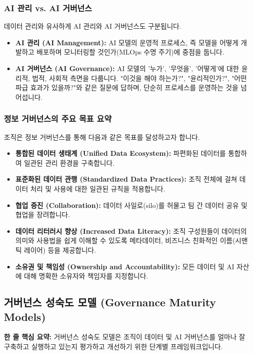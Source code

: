 \documentclass[11pt,a4paper]{article}
\begin{document}
\subsubsection*{AI 관리 vs. AI 거버넌스}
데이터 관리와 유사하게 AI 관리와 AI 거버넌스도 구분됩니다.
\begin{itemize}
    \item \textbf{AI 관리 (AI Management):} AI 모델의 운영적 프로세스, 즉 모델을 어떻게 개발하고 배포하며 모니터링할 것인가(MLOps 수명 주기)에 중점을 둡니다.
    \item \textbf{AI 거버넌스 (AI Governance):} AI 모델의 '누가', '무엇을', '어떻게'에 대한 윤리적, 법적, 사회적 측면을 다룹니다. "이것을 해야 하는가?", "윤리적인가?", "어떤 파급 효과가 있을까?"와 같은 질문에 답하며, 단순히 프로세스를 운영하는 것을 넘어섭니다.
\end{itemize}

\subsubsection*{정보 거버넌스의 주요 목표 요약}
조직은 정보 거버넌스를 통해 다음과 같은 목표를 달성하고자 합니다.
\begin{itemize}
    \item \textbf{통합된 데이터 생태계 (Unified Data Ecosystem):} 파편화된 데이터를 통합하여 일관된 관리 환경을 구축합니다.
    \item \textbf{표준화된 데이터 관행 (Standardized Data Practices):} 조직 전체에 걸쳐 데이터 처리 및 사용에 대한 일관된 규칙을 적용합니다.
    \item \textbf{협업 증진 (Collaboration):} 데이터 사일로(silo)를 허물고 팀 간 데이터 공유 및 협업을 장려합니다.
    \item \textbf{데이터 리터러시 향상 (Increased Data Literacy):} 조직 구성원들이 데이터의 의미와 사용법을 쉽게 이해할 수 있도록 메타데이터, 비즈니스 친화적인 이름(시맨틱 레이어) 등을 제공합니다.
    \item \textbf{소유권 및 책임성 (Ownership and Accountability):} 모든 데이터 및 AI 자산에 대해 명확한 소유자와 책임자를 지정합니다.
\end{itemize}

\newpage
\subsection*{거버넌스 성숙도 모델 (Governance Maturity Models)}

\begin{keyconceptbox}
\textbf{한 줄 핵심 요약:} 거버넌스 성숙도 모델은 조직이 데이터 및 AI 거버넌스를 얼마나 잘 구축하고 실행하고 있는지 평가하고 개선하기 위한 단계별 프레임워크입니다.
\end{keyconceptbox}
\end{document}
